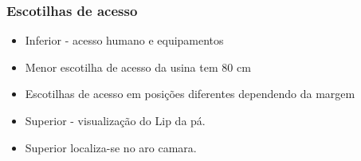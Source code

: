 \subsubsection{Escotilhas de acesso}
\begin{itemize}
  \item Inferior - acesso humano e equipamentos
    \item Menor escotilha de acesso da usina tem 80 cm
  	\item Escotilhas de acesso em posições diferentes dependendo da margem
  \item Superior - visualização do Lip da pá.
  \item Superior localiza-se no aro camara. 
\end{itemize}





